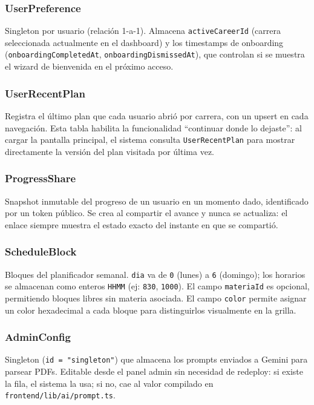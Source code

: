 \documentclass[12pt, a4paper]{report}
\begin{document}
\subsubsection*{UserPreference}

Singleton por usuario (relación 1-a-1). Almacena \texttt{activeCareerId} (carrera
seleccionada actualmente en el dashboard) y los timestamps de onboarding
(\texttt{onboardingCompletedAt}, \texttt{onboardingDismissedAt}), que controlan si se
muestra el wizard de bienvenida en el próximo acceso.

\subsubsection*{UserRecentPlan}

Registra el último plan que cada usuario abrió por carrera, con un upsert en cada
navegación. Esta tabla habilita la funcionalidad ``continuar donde lo dejaste'': al
cargar la pantalla principal, el sistema consulta \texttt{UserRecentPlan} para mostrar
directamente la versión del plan visitada por última vez.

\subsubsection*{ProgressShare}

Snapshot inmutable del progreso de un usuario en un momento dado, identificado por un
token público. Se crea al compartir el avance y nunca se actualiza: el enlace siempre
muestra el estado exacto del instante en que se compartió.

\subsubsection*{ScheduleBlock}

Bloques del planificador semanal. \texttt{dia} va de \texttt{0} (lunes) a \texttt{6}
(domingo); los horarios se almacenan como enteros \texttt{HHMM} (ej: \texttt{830},
\texttt{1000}). El campo \texttt{materiaId} es opcional, permitiendo bloques libres sin
materia asociada. El campo \texttt{color} permite asignar un color hexadecimal a cada
bloque para distinguirlos visualmente en la grilla.

\subsubsection*{AdminConfig}

Singleton (\texttt{id = "singleton"}) que almacena los prompts enviados a Gemini para
parsear PDFs. Editable desde el panel admin sin necesidad de redeploy: si existe la fila,
el sistema la usa; si no, cae al valor compilado en \texttt{frontend/lib/ai/prompt.ts}.
\end{document}
